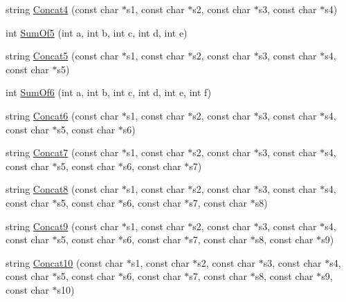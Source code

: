 \begin{DoxyCompactItemize}
\item 
string \hyperlink{namespacetesting_1_1gmock__generated__actions__test_a18260e53a4612dc68eaa3b43a13ad57e}{Concat4} (const char $\ast$s1, const char $\ast$s2, const char $\ast$s3, const char $\ast$s4)
\item 
int \hyperlink{namespacetesting_1_1gmock__generated__actions__test_a7ebfbfdf11d92d4f99df6b659c371e74}{Sum\+Of5} (int a, int b, int c, int d, int e)
\item 
string \hyperlink{namespacetesting_1_1gmock__generated__actions__test_ac9d254c06f94974ffb0acd8d0f1f8d88}{Concat5} (const char $\ast$s1, const char $\ast$s2, const char $\ast$s3, const char $\ast$s4, const char $\ast$s5)
\item 
int \hyperlink{namespacetesting_1_1gmock__generated__actions__test_a3f60acee43510c1603549a1f3bab61ad}{Sum\+Of6} (int a, int b, int c, int d, int e, int f)
\item 
string \hyperlink{namespacetesting_1_1gmock__generated__actions__test_a0d9c60ff363796e3edec3587ce7fc856}{Concat6} (const char $\ast$s1, const char $\ast$s2, const char $\ast$s3, const char $\ast$s4, const char $\ast$s5, const char $\ast$s6)
\item 
string \hyperlink{namespacetesting_1_1gmock__generated__actions__test_ac53c9939d35ebbb093b795161fc42504}{Concat7} (const char $\ast$s1, const char $\ast$s2, const char $\ast$s3, const char $\ast$s4, const char $\ast$s5, const char $\ast$s6, const char $\ast$s7)
\item 
string \hyperlink{namespacetesting_1_1gmock__generated__actions__test_aa6540c5cd5e5cb3ca2253739c05323e8}{Concat8} (const char $\ast$s1, const char $\ast$s2, const char $\ast$s3, const char $\ast$s4, const char $\ast$s5, const char $\ast$s6, const char $\ast$s7, const char $\ast$s8)
\item 
string \hyperlink{namespacetesting_1_1gmock__generated__actions__test_a524a8b6e13732969d177254474c94e2b}{Concat9} (const char $\ast$s1, const char $\ast$s2, const char $\ast$s3, const char $\ast$s4, const char $\ast$s5, const char $\ast$s6, const char $\ast$s7, const char $\ast$s8, const char $\ast$s9)
\item 
string \hyperlink{namespacetesting_1_1gmock__generated__actions__test_ae90b9884fe6a44fa67c323c4f2f46d4f}{Concat10} (const char $\ast$s1, const char $\ast$s2, const char $\ast$s3, const char $\ast$s4, const char $\ast$s5, const char $\ast$s6, const char $\ast$s7, const char $\ast$s8, const char $\ast$s9, const char $\ast$s10)
\item 

\end{DoxyCompactItemize}
